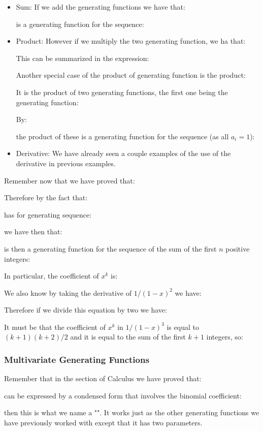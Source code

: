	\begin{itemize}
		\item Sum: If we add the generating functions we have that:
		
		is a generating function for the sequence:
		
		
		\item Product: However if we multiply the two generating function, we ha that:
		
		This can be summarized in the expression:
		
		Another special case of the product of generating function is the product:
		
		It is the product of two generating functions, the first one being the generating function:
		
		By:
		
		the product of these is a generating function for the sequence (as all $a_i=1$):
		
	
		\item Derivative: We have already seen a couple examples of the
use of the derivative in previous examples.
	\end{itemize}
	Remember now that we have proved that:
	
	Therefore by the fact that:
	
	has for generating sequence:
	
	we have then that:
	
	is then a generating function for the sequence of the sum of the first $n$ positive integers:
	
	In particular, the coefficient of $x^k$ is:
	
	We also know by taking the derivative of $1/(1-x)^2$ we have:
	
	Therefore if we divide this equation by two we have:
	
	It must be that the coefficient of $x^k$ in $1/(1-x)^3$ is equal to $(k + 1)(k + 2)/2$ and it is equal to the sum of the first $k+1$ integers, so:
	
	
	\subsubsection{Multivariate Generating Functions}
	Remember that in the section of Calculus we have proved that:
	
	can be expressed by a condensed form that involves the binomial coefficient:
	
	then this is what we name a "". It works just as the other generating functions we have previously worked with except that it has two parameters.
	

